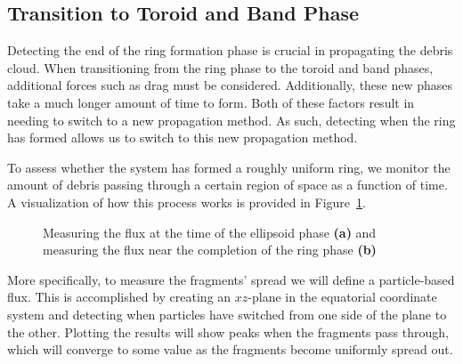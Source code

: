 \documentclass[a4paper, 12pt]{article}
\begin{document}
\subsection{Transition to Toroid and Band Phase}

Detecting the end of the ring formation phase is crucial in propagating the debris cloud. When transitioning from the ring phase to the toroid and band phases, additional forces such as drag must be considered. Additionally, these new phases take a much longer amount of time to form. Both of these factors result in needing to switch to a new propagation method. As such, detecting when the ring has formed allows us to switch to this new propagation method.

To assess whether the system has formed a roughly uniform ring, we monitor the amount of debris passing through a certain region of space as a function of time. A visualization of how this process works is provided in Figure~\ref{flux_diagrams}.

\begin{figure}[h]
	\begin{adjustbox}{max width=1\linewidth,center}
		\centering     %
	\end{adjustbox}
	\caption{Measuring the flux at the time of the ellipsoid phase \textbf{(a)} and measuring the flux near the completion of the ring phase \textbf{(b)} }
	\label{flux_diagrams}
\end{figure}

More specifically, to measure the fragments' spread we will define a particle-based flux. This is accomplished by creating an $xz$-plane in the equatorial coordinate system and detecting when particles have switched from one side of the plane to the other. Plotting the results will show peaks when the fragments pass through, which will converge to some value as the fragments become uniformly spread out.
\end{document}
